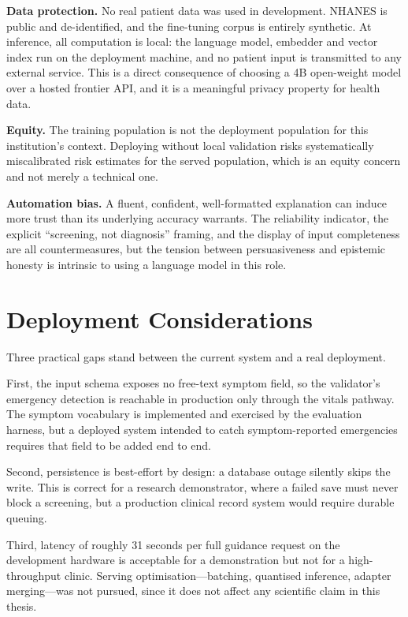 \textbf{Data protection.} No real patient data was used in development. NHANES is
public and de-identified, and the fine-tuning corpus is entirely synthetic. At
inference, all computation is local: the language model, embedder and vector
index run on the deployment machine, and no patient input is transmitted to any
external service. This is a direct consequence of choosing a 4B open-weight
model over a hosted frontier API, and it is a meaningful privacy property for
health data.

\textbf{Equity.} The training population is not the deployment population for
this institution's context. Deploying without local validation risks
systematically miscalibrated risk estimates for the served population, which is
an equity concern and not merely a technical one.

\textbf{Automation bias.} A fluent, confident, well-formatted explanation can
induce more trust than its underlying accuracy warrants. The reliability
indicator, the explicit ``screening, not diagnosis'' framing, and the display of
input completeness are all countermeasures, but the tension between
persuasiveness and epistemic honesty is intrinsic to using a language model in
this role.

\section{Deployment Considerations}
\label{sec:disc_deploy}

Three practical gaps stand between the current system and a real deployment.

First, the input schema exposes no free-text symptom field, so the validator's
emergency detection is reachable in production only through the vitals pathway.
The symptom vocabulary is implemented and exercised by the evaluation harness,
but a deployed system intended to catch symptom-reported emergencies requires
that field to be added end to end.

Second, persistence is best-effort by design: a database outage silently skips
the write. This is correct for a research demonstrator, where a failed save must
never block a screening, but a production clinical record system would require
durable queuing.

Third, latency of roughly 31 seconds per full guidance request on the
development hardware is acceptable for a demonstration but not for a
high-throughput clinic. Serving optimisation---batching, quantised inference,
adapter merging---was not pursued, since it does not affect any scientific claim
in this thesis.
